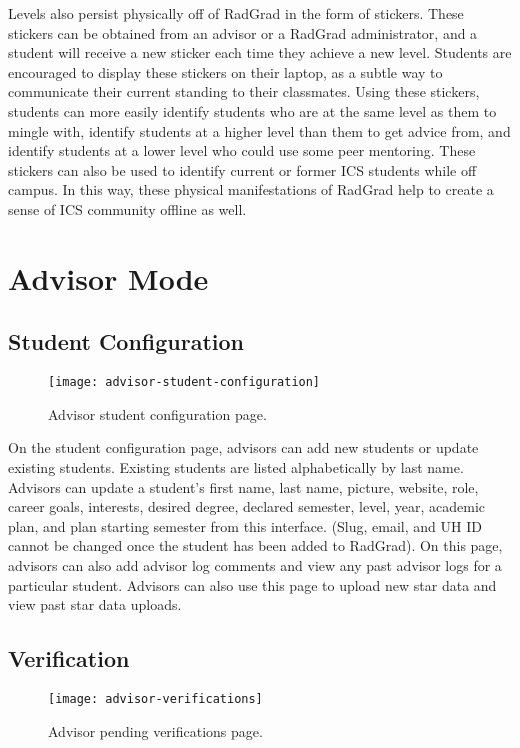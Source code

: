 Levels also persist physically off of RadGrad in the form of stickers. These stickers can be obtained from an advisor or a RadGrad administrator, and a student will receive a new sticker each time they achieve a new level. Students are encouraged to display these stickers on their laptop, as a subtle way to communicate their current standing to their classmates. Using these stickers, students can more easily identify students who are at the same level as them to mingle with, identify students at a higher level than them to get advice from, and identify students at a lower level who could use some peer mentoring. These stickers can also be used to identify current or former ICS students while off campus. In this way, these physical manifestations of RadGrad help to create a sense of ICS community offline as well. 

\section{Advisor Mode}
\subsection{Student Configuration}
\begin{figure}[htbp!]
\centering
\texttt{[image: advisor-student-configuration]}
\caption{Advisor student configuration page.}
\end{figure}
On the student configuration page, advisors can add new students or update existing students. Existing students are listed alphabetically by last name. Advisors can update a student's first name, last name, picture, website, role, career goals, interests, desired degree, declared semester, level, year, academic plan, and plan starting semester from this interface. (Slug, email, and UH ID cannot be changed once the student has been added to RadGrad). On this page, advisors can also add advisor log comments and view any past advisor logs for a particular student. Advisors can also use this page to upload new star data and view past star data uploads. 
\subsection{Verification}
\begin{figure}[htbp!]
\centering
\texttt{[image: advisor-verifications]}
\caption{Advisor pending verifications page.}
\end{figure}

